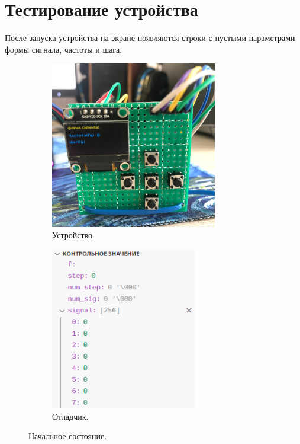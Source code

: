 \section{Тестирование устройства}
	
	После запуска устройства на экране появляются строки с пустыми параметрами формы сигнала, частоты и шага.

	\begin{figure}[H]
     \begin{subfigure}[H]{0.5\textwidth}
         \centering
         \includegraphics[width=0.8\textwidth]{../image/test0_u_s.jpg}
         \caption{Устройство.}
     \end{subfigure}
     \hfill
     \begin{subfigure}[H]{0.5\textwidth}
         \centering
         \includegraphics[width=0.7\textwidth]{../image/test0_o_s.png}
         \caption{Отладчик.}
     \end{subfigure}
        \caption{Начальное состояние.}
	\end{figure}
	
